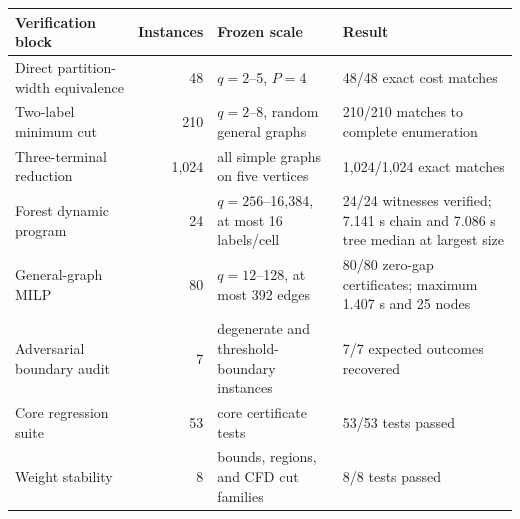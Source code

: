 \begin{tabularx}{\textwidth}{@{}p{}r p{}X@{}}
\toprule
Verification block & Instances & Frozen scale & Result \\
\midrule
Direct partition-width equivalence & 48 & $q=2$--5, $P=4$ & 48/48 exact cost matches \\
Two-label minimum cut & 210 & $q=2$--8, random general graphs & 210/210 matches to complete enumeration \\
Three-terminal reduction & 1,024 & all simple graphs on five vertices & 1,024/1,024 exact matches \\
Forest dynamic program & 24 & $q=256$--16,384, at most 16 labels/cell & 24/24 witnesses verified; 7.141 s chain and 7.086 s tree median at largest size \\
General-graph MILP & 80 & $q=12$--128, at most 392 edges & 80/80 zero-gap certificates; maximum 1.407 s and 25 nodes \\
Adversarial boundary audit & 7 & degenerate and threshold-boundary instances & 7/7 expected outcomes recovered \\
Core regression suite & 53 & core certificate tests & 53/53 tests passed \\
Weight stability & 8 & bounds, regions, and CFD cut families & 8/8 tests passed \\
\bottomrule
\end{tabularx}
